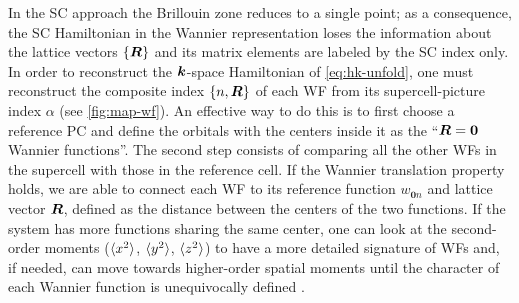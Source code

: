 In the SC approach the Brillouin zone reduces to a single point; as a consequence, the SC Hamiltonian in the Wannier representation loses the information about the lattice vectors $\{{\bm R}\}$ and its matrix elements are labeled by the SC index only. In order to reconstruct the ${\bm k}$-space Hamiltonian of \cref{eq:hk-unfold}, one must reconstruct the composite index $\{n,{\bm R}\}$ of each WF from its supercell-picture index ${\alpha}$ (see \cref{fig:map-wf}). An effective way to do this is to first choose a reference PC and define the orbitals with the centers inside it as the ``${\bm R}=\bm{0}$ Wannier functions''. The second step consists of comparing all the other WFs in the supercell with those in the reference cell. If the Wannier translation property holds, we are able to connect each WF to its reference function $w_{\bm{0} n}$ and lattice vector ${\bm R}$, defined as the distance between the centers of the two functions. If the system has more functions sharing the same center, one can look at the second-order moments ($\braket{x^2}$, $\braket{y^2}$, $\braket{z^2}$) to have a more detailed signature of WFs and, if needed, can move towards higher-order spatial moments until the character of each Wannier function is unequivocally defined \cite{shelley_automated_2011}.

